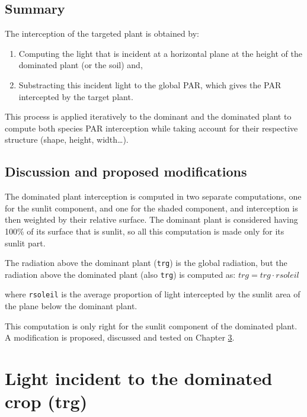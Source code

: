 \documentclass[]{book}
\providecommand{\tightlist}{%
  \setlength{\itemsep}{0pt}\setlength{\parskip}{0pt}}
\theoremstyle{definition}
\theoremstyle{definition}
\theoremstyle{definition}
\theoremstyle{remark}
\begin{document}
\section{Summary}\label{summary}

The interception of the targeted plant is obtained by:

\begin{enumerate}
\def\labelenumi{\arabic{enumi}.}
\tightlist
\item
  Computing the light that is incident at a horizontal plane at the
  height of the dominated plant (or the soil) and,
\item
  Substracting this incident light to the global PAR, which gives the
  PAR intercepted by the target plant.
\end{enumerate}

This process is applied iteratively to the dominant and the dominated
plant to compute both species PAR interception while taking account for
their respective structure (shape, height, width\ldots{}).

\section{Discussion and proposed
modifications}\label{discussion-and-proposed-modifications}

The dominated plant interception is computed in two separate
computations, one for the sunlit component, and one for the shaded
component, and interception is then weighted by their relative surface.
The dominant plant is considered having 100\% of its surface that is
sunlit, so all this computation is made only for its sunlit part.

The radiation above the dominant plant (\texttt{trg}) is the global
radiation, but the radiation above the dominated plant (also
\texttt{trg}) is computed as: \(trg=trg\cdot rsoleil\)

where \texttt{rsoleil} is the average proportion of light intercepted by
the sunlit area of the plane below the dominant plant.

This computation is only right for the sunlit component of the dominated
plant. A modification is proposed, discussed and tested on Chapter
\ref{trg}.

\chapter{Light incident to the dominated crop (trg)}\label{trg}
\end{document}
